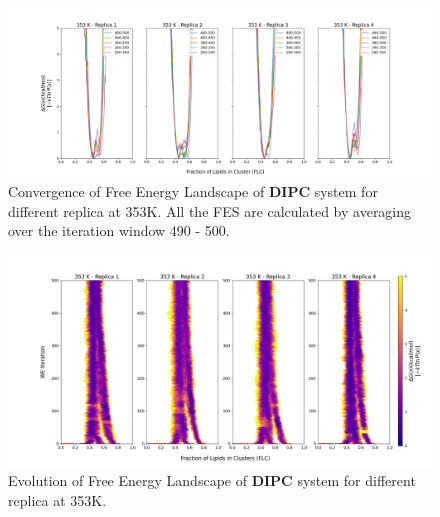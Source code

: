 \documentclass{biophys-new}
\begin{document}
\begin{figure}[hbt!]
\centering
\includegraphics[width=1.1\linewidth]{all_plots/ClusterLipids2Total/DPPC_DIPC_CHOL/353K/Convergence_DIPC_353_ClusterLipids2Total.png}
\caption{Convergence of Free Energy Landscape of \textbf{DIPC} system for different replica at 353K. All the FES are calculated by averaging over the iteration window 490 - 500.}
\label{fig:view}

\end{figure}

\begin{figure}[hbt!]
\centering
\includegraphics[width=1.1\linewidth]{all_plots/ClusterLipids2Total/DPPC_DIPC_CHOL/353K/Evolution_DIPC_353_ClusterLipids2Total.png}
\caption{Evolution of Free Energy Landscape of \textbf{DIPC} system for different replica at 353K.}
\label{fig:view}

\end{figure}

\clearpage
\end{document}
